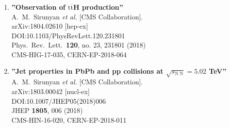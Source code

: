 \begin{enumerate}
\item%
{\bf ''Observation of $\mathrm{t\overline{t}}$H production''}
  \\{}A.~M.~Sirunyan {\it et al.} [CMS Collaboration].
  \\{}arXiv:1804.02610 [hep-ex]
  \\{}DOI:10.1103/PhysRevLett.120.231801
  \\{}Phys.\ Rev.\ Lett.\  {\bf 120}, no. 23, 231801 (2018)
  \\{}CMS-HIG-17-035, CERN-EP-2018-064

\item%
{\bf ''Jet properties in PbPb and pp collisions at $ \sqrt{s_{\mathrm{N}\;\mathrm{N}}}=5.02 $ TeV''}
  \\{}A.~M.~Sirunyan {\it et al.} [CMS Collaboration].
  \\{}arXiv:1803.00042 [nucl-ex]
  \\{}DOI:10.1007/JHEP05(2018)006
  \\{}JHEP {\bf 1805}, 006 (2018)
  \\{}CMS-HIN-16-020, CERN-EP-2018-011

\end{enumerate}
